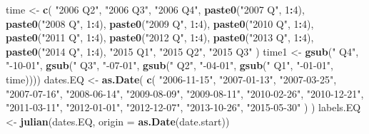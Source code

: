 \documentclass[
]{article}
\newenvironment{Shaded}{\begin{snugshade}}{\end{snugshade}}
\newcommand{\DataTypeTok}[1]{\textcolor[rgb]{0.13,0.29,0.53}{#1}}
\newcommand{\DecValTok}[1]{\textcolor[rgb]{0.00,0.00,0.81}{#1}}
\newcommand{\KeywordTok}[1]{\textcolor[rgb]{0.13,0.29,0.53}{\textbf{#1}}}
\newcommand{\NormalTok}[1]{#1}
\newcommand{\OperatorTok}[1]{\textcolor[rgb]{0.81,0.36,0.00}{\textbf{#1}}}
\newcommand{\StringTok}[1]{\textcolor[rgb]{0.31,0.60,0.02}{#1}}
\begin{document}
\begin{Shaded}
\begin{Highlighting}[]
\NormalTok{time <-}\StringTok{ }\KeywordTok{c}\NormalTok{(}
  \StringTok{"2006 Q2"}\NormalTok{,}
  \StringTok{"2006 Q3"}\NormalTok{,}
  \StringTok{"2006 Q4"}\NormalTok{,}
  \KeywordTok{paste0}\NormalTok{(}\StringTok{"2007 Q"}\NormalTok{, }\DecValTok{1}\OperatorTok{:}\DecValTok{4}\NormalTok{),}
  \KeywordTok{paste0}\NormalTok{(}\StringTok{"2008 Q"}\NormalTok{, }\DecValTok{1}\OperatorTok{:}\DecValTok{4}\NormalTok{),}
  \KeywordTok{paste0}\NormalTok{(}\StringTok{"2009 Q"}\NormalTok{, }\DecValTok{1}\OperatorTok{:}\DecValTok{4}\NormalTok{),}
  \KeywordTok{paste0}\NormalTok{(}\StringTok{"2010 Q"}\NormalTok{, }\DecValTok{1}\OperatorTok{:}\DecValTok{4}\NormalTok{),}
  \KeywordTok{paste0}\NormalTok{(}\StringTok{"2011 Q"}\NormalTok{, }\DecValTok{1}\OperatorTok{:}\DecValTok{4}\NormalTok{),}
  \KeywordTok{paste0}\NormalTok{(}\StringTok{"2012 Q"}\NormalTok{, }\DecValTok{1}\OperatorTok{:}\DecValTok{4}\NormalTok{),}
  \KeywordTok{paste0}\NormalTok{(}\StringTok{"2013 Q"}\NormalTok{, }\DecValTok{1}\OperatorTok{:}\DecValTok{4}\NormalTok{),}
  \KeywordTok{paste0}\NormalTok{(}\StringTok{"2014 Q"}\NormalTok{, }\DecValTok{1}\OperatorTok{:}\DecValTok{4}\NormalTok{),}
  \StringTok{"2015 Q1"}\NormalTok{,}
  \StringTok{"2015 Q2"}\NormalTok{,}
  \StringTok{"2015 Q3"}
\NormalTok{)}
\NormalTok{time1 <-}\StringTok{ }\KeywordTok{gsub}\NormalTok{(}\StringTok{" Q4"}\NormalTok{, }\StringTok{"-10-01"}\NormalTok{,}
              \KeywordTok{gsub}\NormalTok{(}\StringTok{" Q3"}\NormalTok{, }\StringTok{"-07-01"}\NormalTok{,}
                   \KeywordTok{gsub}\NormalTok{(}\StringTok{" Q2"}\NormalTok{, }\StringTok{"-04-01"}\NormalTok{,}
                        \KeywordTok{gsub}\NormalTok{(}\StringTok{" Q1"}\NormalTok{, }\StringTok{"-01-01"}\NormalTok{, time))))}
\NormalTok{dates.EQ <-}
\StringTok{  }\KeywordTok{as.Date}\NormalTok{(}
    \KeywordTok{c}\NormalTok{(}
      \StringTok{"2006-11-15"}\NormalTok{,}
      \StringTok{"2007-01-13"}\NormalTok{,}
      \StringTok{"2007-03-25"}\NormalTok{,}
      \StringTok{"2007-07-16"}\NormalTok{,}
      \StringTok{"2008-06-14"}\NormalTok{,}
      \StringTok{"2009-08-09"}\NormalTok{,}
      \StringTok{"2009-08-11"}\NormalTok{,}
      \StringTok{"2010-02-26"}\NormalTok{,}
      \StringTok{"2010-12-21"}\NormalTok{,}
      \StringTok{"2011-03-11"}\NormalTok{,}
      \StringTok{"2012-01-01"}\NormalTok{,}
      \StringTok{"2012-12-07"}\NormalTok{,}
      \StringTok{"2013-10-26"}\NormalTok{,}
      \StringTok{"2015-05-30"}
\NormalTok{    )}
\NormalTok{  )}
\NormalTok{labels.EQ <-}\StringTok{ }\KeywordTok{julian}\NormalTok{(dates.EQ,  }\DataTypeTok{origin =} \KeywordTok{as.Date}\NormalTok{(date.start))}

\end{Highlighting}
\end{Shaded}
\end{document}
